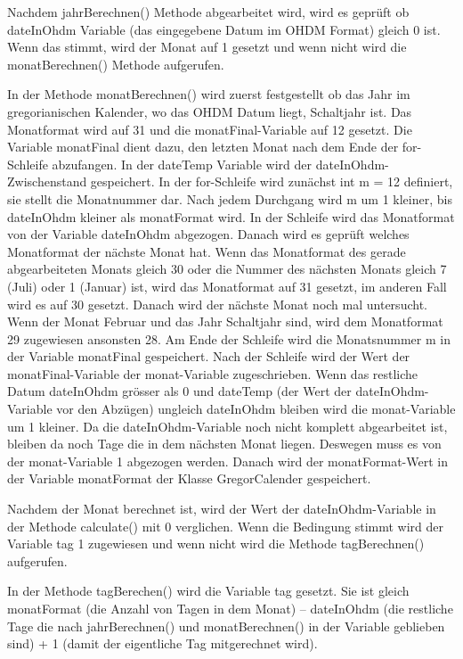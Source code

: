 \documentclass[]{article}
\begin{document}
Nachdem jahrBerechnen() Methode abgearbeitet wird, wird es geprüft ob dateInOhdm Variable (das eingegebene Datum im OHDM Format) gleich 0 ist. Wenn das stimmt, wird der Monat auf 1 gesetzt  und wenn nicht wird die monatBerechnen() Methode aufgerufen.

In der Methode monatBerechnen() wird zuerst festgestellt ob das Jahr im gregorianischen Kalender, wo das OHDM Datum liegt, Schaltjahr ist. Das Monatformat wird auf 31 und die monatFinal-Variable auf 12 gesetzt. Die Variable monatFinal dient dazu, den letzten Monat nach dem Ende der for-Schleife abzufangen. In der dateTemp Variable wird der dateInOhdm-Zwischenstand gespeichert. In der for-Schleife wird zunächst int m = 12 definiert, sie stellt die Monatnummer dar. Nach jedem Durchgang wird m um 1 kleiner, bis dateInOhdm kleiner als monatFormat wird.
In der Schleife wird das Monatformat von der Variable dateInOhdm abgezogen. Danach wird es geprüft welches Monatformat der nächste Monat hat. Wenn das Monatformat des gerade abgearbeiteten Monats gleich 30 oder die Nummer des nächsten Monats gleich 7 (Juli) oder 1 (Januar) ist, wird das Monatformat auf 31 gesetzt, im anderen Fall wird es auf 30 gesetzt. Danach wird der nächste Monat noch mal untersucht. Wenn der Monat Februar und das Jahr Schaltjahr sind, wird dem Monatformat 29 zugewiesen ansonsten 28. Am Ende der Schleife wird die Monatsnummer m in der Variable monatFinal gespeichert. 
Nach der Schleife wird der Wert der monatFinal-Variable der monat-Variable zugeschrieben. Wenn das restliche Datum dateInOhdm grösser als 0 und dateTemp (der Wert der dateInOhdm-Variable vor den Abzügen) ungleich dateInOhdm bleiben wird die monat-Variable um 1 kleiner. Da die dateInOhdm-Variable noch nicht komplett abgearbeitet ist, bleiben da noch Tage die in dem nächsten Monat liegen. Deswegen muss es von der monat-Variable 1 abgezogen werden. Danach wird der monatFormat-Wert in der Variable monatFormat der Klasse GregorCalender gespeichert.

Nachdem der Monat berechnet ist, wird der Wert der dateInOhdm-Variable in der Methode calculate() mit 0 verglichen. Wenn die Bedingung stimmt wird der Variable tag 1 zugewiesen und wenn nicht wird die Methode tagBerechnen() aufgerufen.

In der Methode tagBerechen() wird die Variable tag gesetzt. Sie ist gleich monatFormat (die Anzahl von Tagen in dem Monat) – dateInOhdm (die restliche Tage die nach jahrBerechnen() und monatBerechnen() in der Variable geblieben sind) + 1 (damit der eigentliche Tag mitgerechnet wird).
\end{document}
